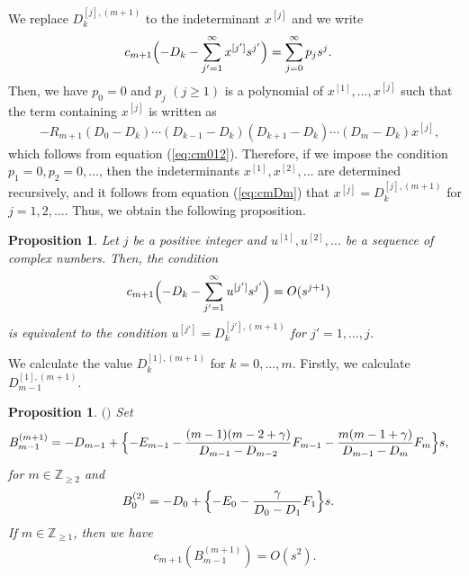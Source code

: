 \documentclass[12pt]{amsart}
\newcommand{\Zint}{\mathbb {Z}}
\numberwithin{equation}{section}
\newtheorem{prop}[thm]{Proposition}
\theoremstyle{definition}
\theoremstyle{remark}
\begin{document}
We replace $D_k^{[j],(m+1)}$ to the indeterminant $x^{[j]}$ and we write
\begin{align}
& c_{m+1} \Bigl( - D_k - \sum _{j'=1}^{\infty } x^{[j']} s^{j'}  \Bigr) = \sum _{j=0}^{\infty} p_j s^j .
\end{align}
Then, we have $p_0=0$ and $p_j$ $(j \geq 1)$ is a polynomial of $x^{[1]}, \dots , x^{[j]}$ such that the term containing $x^{[j]} $ is written as 
\begin{align}
& - R_{m+1} (D_0 -D_k) \cdots (D_{k-1} -D_k) (D_{k+1} -D_k) \cdots (D_{m} -D_k) x^{[j]} ,
\end{align}
which follows from equation (\ref{eq:cm012}).
Therefore, if we impose the condition $p_1 =0, p_2 =0, \dots $, then the indeterminants $x^{[1]}, x^{[2]}, \dots $ are determined recursively, and it follows from equation (\ref{eq:cmDm}) that $ x^{[j]} = D_k^{[j],(m+1)}$ for $j=1,2,\dots $.
Thus, we obtain the following proposition.
\begin{prop} \label{prop:cmOj}
Let $j$ be a positive integer and $u^{[1]}, u^{[2]}, \dots $ be a sequence of complex numbers.
Then, the condition
\begin{align}
& c_{m+1} \Bigl( -D_k - \sum _{j'=1}^{\infty } u^{[j']} s^{j'}  \Bigr) = O(s^{j+1}) 
\end{align}
is equivalent to the condition
$ u^{[j']} = D_k^{[j'],(m+1)}$ for $j'=1,\dots ,j$.
\end{prop}
We calculate the value $D_k^{[1],(m+1) }$ for $k=0,\dots ,m$.
Firstly, we calculate $D_{m-1}^{[1],(m+1)} $.
\begin{prop} $($\cite{M}$)$ \label{prop:B1}
Set
\begin{align}
& B_{m-1}^{(m+1)}= -D_{m-1}+\Bigl\{-E_{m-1}-\frac{(m-1)(m-2+\gamma)}{D_{m-1}-D_{m-2}}F_{m-1}-\frac{m(m-1+\gamma)}{D_{m-1} -D_{m}}F_{m}\Bigr\}s ,
\label{B_m-1}
\end{align}
for $m \in \Zint _{\geq 2} $ and 
\begin{align}
& B_{0}^{(2)}= -D_{0}+\Bigl\{-E_{0}-\frac{\gamma }{D_0 -D_1}F_{1}\Bigr\}s .
\label{B_m-11}
\end{align}
If $m \in \Zint _{\geq 1}$, then we have
\begin{align}
  c_{m+1}(B_{m-1}^{(m+1)})= O(s^2)  . \label{eq:propOs^2}
\end{align}
\end{prop}
\end{document}
